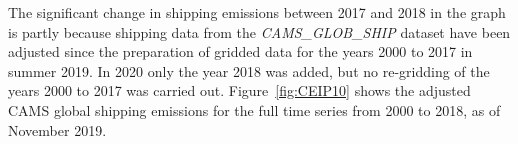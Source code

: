 The significant change in shipping emissions between 2017 and 2018 in the graph is partly because shipping data from the {\it CAMS\_GLOB\_SHIP} dataset have been adjusted since the preparation of gridded data for the years 2000 to 2017 in summer 2019. In 2020 only the year 2018 was added, but no re-gridding of the years 2000 to 2017 was carried out. Figure~\ref{fig:CEIP10} shows the adjusted CAMS global shipping emissions for the full time series from 2000 to 2018, as of November 2019.




\clearpage
\renewcommand\bibname{References}      %


